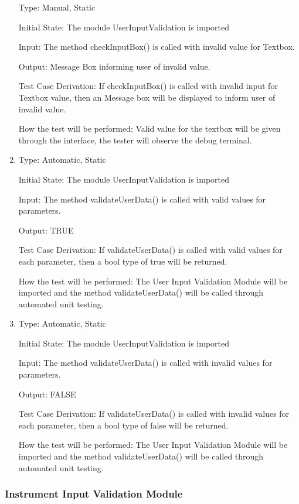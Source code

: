 \documentclass[12pt, titlepage]{article}
\begin{document}
\begin{enumerate}[{UT-UI}1.]
  Type: Manual, Static 

  Initial State: The module UserInputValidation is imported

  Input: The method checkInputBox() is called with invalid value for Textbox.

  Output: Message Box informing user of invalid value.

  Test Case Derivation: If checkInputBox() is called with invalid  input for Textbox value, then an Message box will be displayed to inform user of invalid value.

  How the test will be performed: Valid value for the textbox will be given through the interface, the tester will observe the debug terminal.
  
  \item
  
  Type: Automatic, Static 

  Initial State: The module UserInputValidation is imported

  Input: The method validateUserData() is called with valid values for parameters.

  Output: TRUE

  Test Case Derivation: If validateUserData() is called with valid values for each parameter, then a bool type of true will be returned.

  How the test will be performed: The User Input Validation Module will be imported and the method validateUserData() will be called through automated unit testing. 

  \item
  
  Type: Automatic, Static 

  Initial State: The module UserInputValidation is imported

  Input: The method validateUserData() is called with invalid values for parameters.

  Output: FALSE

  Test Case Derivation: If validateUserData() is called with invalid values for each parameter, then a bool type of false will be returned.

  How the test will be performed: The User Input Validation Module will be imported and the method validateUserData() will be called through automated unit testing. 

\end{enumerate}

\subsubsection{Instrument Input Validation Module }
\end{document}
